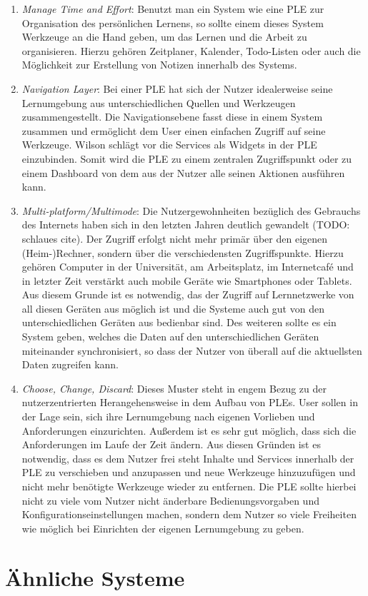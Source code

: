 \begin{enumerate}
 \item \emph{Manage Time and Effort}\label{wilson_patterns:manage_time_effort}: Benutzt man ein System wie eine PLE zur Organisation des persönlichen Lernens, so sollte einem dieses System Werkzeuge an die Hand geben, um das Lernen und die Arbeit zu organisieren. Hierzu gehören Zeitplaner, Kalender, Todo-Listen oder auch die Möglichkeit zur Erstellung von Notizen innerhalb des Systems.
 \item \emph{Navigation Layer}\label{wilson_patterns:navigation_layer}: Bei einer PLE hat sich der Nutzer idealerweise seine Lernumgebung aus unterschiedlichen Quellen und Werkzeugen zusammengestellt. Die Navigationsebene fasst diese in einem System zusammen und ermöglicht dem User einen einfachen Zugriff auf seine Werkzeuge. Wilson schlägt vor die Services als Widgets in der PLE einzubinden. Somit wird die PLE zu einem zentralen Zugriffspunkt oder zu einem Dashboard von dem aus der Nutzer alle seinen Aktionen ausführen kann. 
 \item \emph{Multi-platform/Multimode}\label{wilson_patterns:multimode}: Die Nutzergewohnheiten bezüglich des Gebrauchs des Internets haben sich in den letzten Jahren deutlich gewandelt (TODO: schlaues cite). Der Zugriff erfolgt nicht mehr primär über den eigenen (Heim-)Rechner, sondern über die verschiedensten Zugriffspunkte. Hierzu gehören Computer in der Universität, am Arbeitsplatz, im Internetcafé und in letzter Zeit verstärkt auch mobile Geräte wie Smartphones oder Tablets. Aus diesem Grunde ist es notwendig, das der Zugriff auf Lernnetzwerke von all diesen Geräten aus möglich ist und die Systeme auch gut von den unterschiedlichen Geräten aus bedienbar sind. Des weiteren sollte es ein System geben, welches die Daten auf den unterschiedlichen Geräten miteinander synchronisiert, so dass der Nutzer von überall auf die aktuellsten Daten zugreifen kann.
 \item \emph{Choose, Change, Discard}\label{wilson_patterns:choose_change_discard}: Dieses Muster steht in engem Bezug zu der nutzerzentrierten Herangehensweise in dem Aufbau von PLEs. User sollen in der Lage sein, sich ihre Lernumgebung nach eigenen Vorlieben und Anforderungen einzurichten. Außerdem ist es sehr gut möglich, dass sich die Anforderungen im Laufe der Zeit ändern. Aus diesen Gründen ist es notwendig, dass es dem Nutzer frei steht Inhalte und Services innerhalb der PLE zu verschieben und anzupassen und neue Werkzeuge hinzuzufügen und nicht mehr benötigte Werkzeuge wieder zu entfernen. Die PLE sollte hierbei nicht zu viele vom Nutzer nicht änderbare Bedienungsvorgaben und Konfigurationseinstellungen machen, sondern dem Nutzer so viele Freiheiten wie möglich bei Einrichten der eigenen Lernumgebung zu geben.
\end{enumerate}

\section{Ähnliche Systeme}